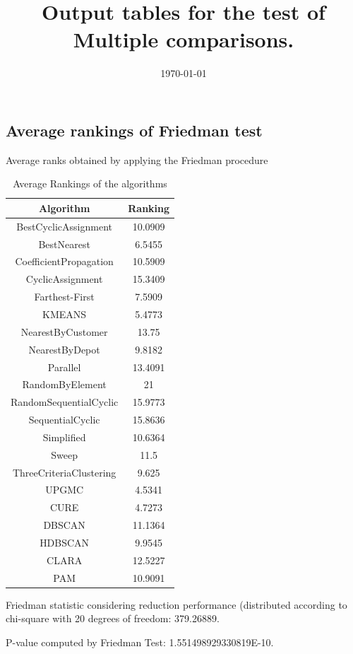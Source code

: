 \documentclass[a4paper,10pt]{article}
\title{Output tables for the test of Multiple comparisons.}
\author{}
\date{\today}
\begin{document}
\begin{landscape}
\pagestyle{empty}
\maketitle
\thispagestyle{empty}
\section{Average rankings of Friedman test}



Average ranks obtained by applying the Friedman procedure

\begin{table}[!htp]
\centering
\begin{tabular}{|c|c|}\hline
Algorithm&Ranking\\\hline
BestCyclicAssignment & 10.0909\\
BestNearest & 6.5455\\
CoefficientPropagation & 10.5909\\
CyclicAssignment & 15.3409\\
Farthest-First & 7.5909\\
KMEANS & 5.4773\\
NearestByCustomer & 13.75\\
NearestByDepot & 9.8182\\
Parallel & 13.4091\\
RandomByElement & 21\\
RandomSequentialCyclic & 15.9773\\
SequentialCyclic & 15.8636\\
Simplified & 10.6364\\
Sweep & 11.5\\
ThreeCriteriaClustering & 9.625\\
UPGMC & 4.5341\\
CURE & 4.7273\\
DBSCAN & 11.1364\\
HDBSCAN & 9.9545\\
CLARA & 12.5227\\
PAM & 10.9091\\
\hline
\end{tabular}
\caption{Average Rankings of the algorithms}
\end{table}

Friedman statistic considering reduction performance (distributed according to chi-square with 20 degrees of freedom: 379.26889.

P-value computed by Friedman Test: 1.551498929330819E-10.\newline


\end{landscape}
\end{document}
